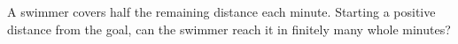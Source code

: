 A swimmer covers half the remaining distance each minute. Starting a positive distance from the goal, can the swimmer reach it in finitely many whole minutes?
